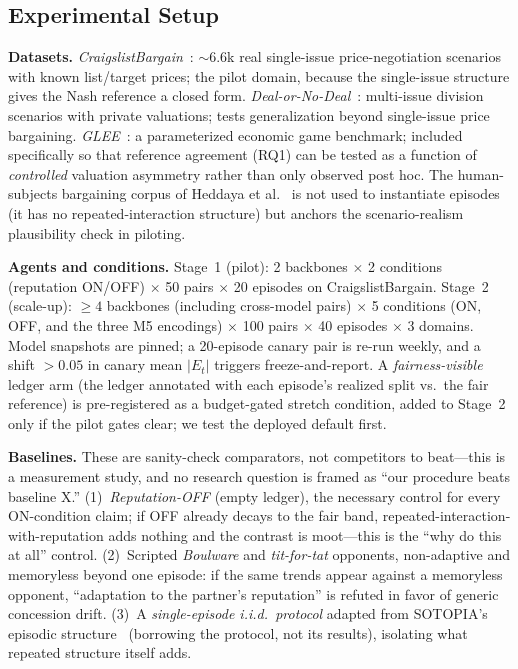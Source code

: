 \documentclass[conference]{IEEEtran}
\newcommand{\Et}{E_t}
\begin{document}
\subsection{Experimental Setup}\label{sec:setup}

\textbf{Datasets.} \emph{CraigslistBargain}~\cite{he2018}: $\sim$6.6k real
single-issue price-negotiation scenarios with known list/target prices; the
pilot domain, because the single-issue structure gives the Nash reference a
closed form. \emph{Deal-or-No-Deal}~\cite{lewis2017}: multi-issue division
scenarios with private valuations; tests generalization beyond single-issue
price bargaining. \emph{GLEE}~\cite{shapira2024glee}: a parameterized economic
game benchmark; included specifically so that reference agreement (RQ1) can be
tested as a function of \emph{controlled} valuation asymmetry rather than only
observed post hoc. The human-subjects bargaining corpus of
Heddaya et al.~\cite{heddaya2023} is not used to instantiate episodes (it has
no repeated-interaction structure) but anchors the scenario-realism
plausibility check in piloting.

\textbf{Agents and conditions.} Stage~1 (pilot): 2 backbones $\times$ 2
conditions (reputation ON/OFF) $\times$ 50 pairs $\times$ 20 episodes on
CraigslistBargain. Stage~2 (scale-up): $\geq 4$ backbones (including
cross-model pairs) $\times$ 5 conditions (ON, OFF, and the three M5 encodings)
$\times$ 100 pairs $\times$ 40 episodes $\times$ 3 domains. Model snapshots
are pinned; a 20-episode canary pair is re-run weekly, and a shift
$> 0.05$ in canary mean $|\Et|$ triggers freeze-and-report. A
\emph{fairness-visible} ledger arm (the ledger annotated with each episode's
realized split vs.\ the fair reference) is pre-registered as a budget-gated
stretch condition, added to Stage~2 only if the pilot gates clear; we test the
deployed default first.

\textbf{Baselines.} These are sanity-check comparators, not competitors to
beat---this is a measurement study, and no research question is framed as
``our procedure beats baseline X.'' (1)~\emph{Reputation-OFF} (empty ledger),
the necessary control for every ON-condition claim; if OFF already decays to
the fair band, repeated-interaction-with-reputation adds nothing and the
contrast is moot---this is the ``why do this at all'' control. (2)~Scripted
\emph{Boulware} and \emph{tit-for-tat} opponents, non-adaptive and memoryless
beyond one episode: if the same trends appear against a memoryless opponent,
``adaptation to the partner's reputation'' is refuted in favor of generic
concession drift. (3)~A \emph{single-episode i.i.d.\ protocol} adapted from
SOTOPIA's episodic structure~\cite{sotopia} (borrowing the protocol, not its
results), isolating what repeated structure itself adds.
\end{document}
